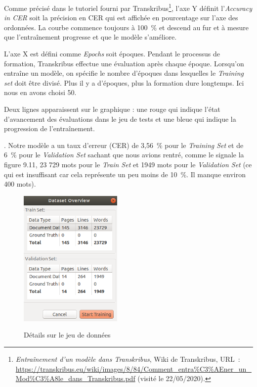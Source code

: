 Comme précisé dans le tutoriel fourni par Transkribus\footnote{\emph{Entraînement d’un modèle dans Transkribus}, Wiki de Transkribus, URL~: \url{https://transkribus.eu/wiki/images/8/84/Comment_entra\%C3\%AEner_un_Mod\%C3\%A8le_dans_Transkribus.pdf} (visité le 22/05/2020).}, l'axe Y définit l'\emph{Accuracy in CER} soit la précision en CER qui est affichée en pourcentage sur l'axe des ordonnées. La courbe
commence toujours à 100~\% et descend au fur et à mesure que l'entraînement progresse et que le modèle s'améliore.

L'axe X est défini comme \emph{Epochs} soit époques. Pendant le processus de formation, Transkribus effectue une évaluation après chaque époque. Lorsqu'on entraîne un modèle, on spécifie le nombre d'époques dans lesquelles le \emph{Training set} doit être divisé. Plus il y a d'époques, plus la formation dure longtemps. Ici nous en avons choisi 50.

Deux lignes apparaissent sur le graphique : une rouge qui indique l'état d'avancement des évaluations dans le jeu de tests et une bleue qui indique la progression de l'entraînement. 

. Notre modèle a un taux d'erreur (CER) de 3,56~\% pour le \emph{Training Set}  et de 6~\% pour le \emph{Validation Set} sachant que nous avions rentré, comme le signale la figure 9.11, 23 729 mots pour le \emph{Train Set} et 1949 mots pour le \emph{Validation Set} (ce qui est insuffisant car cela représente un peu moins de 10~\%. Il manque environ 400 mots).

 \begin{figure}[ht]
    \centering
    \caption{Détails sur le jeu de données}
    \includegraphics[width=5cm]{images/ToutLPV4datasetOverview.png}
    \label{ToutLPV4datasetOverview}
\end{figure}


